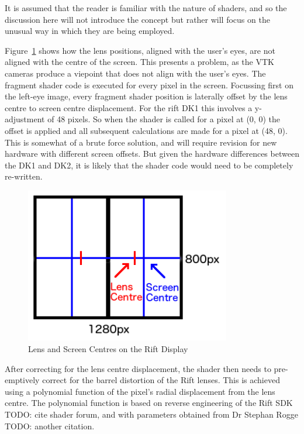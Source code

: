 \documentclass[MSc,paper=a4,pagesize=auto]{icldt}
\begin{document}
It is assumed that the reader is familiar with the nature of shaders, and so the discussion here will not introduce the concept but rather will focus on the unusual way in which they are being employed. 

Figure~\ref{fig:rift_screen} shows how the lens positions, aligned with the user's eyes, are not aligned with the centre of the screen. This presents a problem, as the VTK cameras produce a viepoint that does not align with the user's eyes. The fragment shader code is executed for every pixel in the screen. Focussing first on the left-eye image, every fragment shader position is laterally offset by the lens centre to screen centre displacement. For the rift DK1 this involves a y-adjustment of 48 pixels. So when the shader is called for a pixel at (0, 0) the offset is applied and all subsequent calculations are made for a pixel at (48, 0). This is somewhat of a brute force solution, and will require revision for new hardware with different screen offsets. But given the hardware differences between the DK1 and DK2, it is likely that the shader code would need to be completely re-written.

\begin{figure}[htbp!]
    \centering
    \includegraphics[width=0.8\textwidth]{resources/rift_screen}
    \caption{Lens and Screen Centres on the Rift Display}
    \label{fig:rift_screen}
\end{figure}

After correcting for the lens centre displacement, the shader then needs to pre-emptively correct for the barrel distortion of the Rift lenses. This is achieved using a polynomial function of the pixel's radial displacement from the lens centre. The polynomial function is based on reverse engineering of the Rift SDK TODO: cite shader forum, and with parameters obtained from Dr Stephan Rogge TODO: another citation. 
\end{document}
